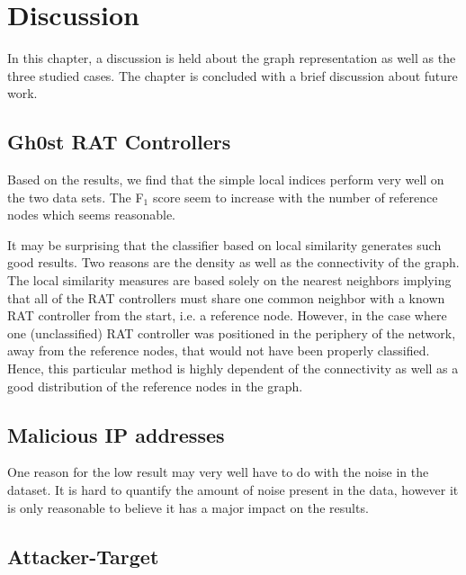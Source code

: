 \chapter{Discussion}
In this chapter, a discussion is held about the graph representation as well as the three studied cases. The chapter is concluded with a brief discussion about future work.

\section{Gh0st RAT Controllers}
Based on the results, we find that the simple local indices perform very well on the two data sets. The F$_1$ score seem to increase with the number of reference nodes which seems reasonable. 

It may be surprising that the classifier based on local similarity generates such good results. Two reasons are the density as well as the connectivity of the graph. The local similarity measures are based solely on the nearest neighbors implying that all of the RAT controllers must share one common neighbor with a known RAT controller from the start, i.e. a reference node. However, in the case where one (unclassified) RAT controller was positioned in the periphery of the network, away from the reference nodes, that would not have been properly classified. Hence, this particular method is highly dependent of the connectivity as well as a good distribution of the reference nodes in the graph. 


\section{Malicious IP addresses}



One reason for the low result may very well have to do with the noise in the dataset. It is hard to quantify the amount of noise present in the data, however it is only reasonable to believe it has a major impact on the results.

\section{Attacker-Target}

